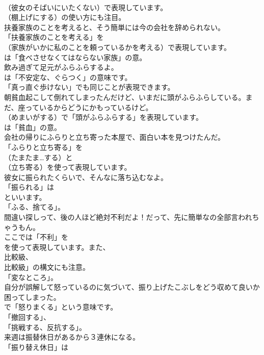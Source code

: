 \documentclass[8pt]{extreport}
\begin{document}
\begin{CJK}{UTF8}{min}
\\	（彼女のそばいにいたくない）で表現しています。
\\	（棚上げにする）の使い方にも注目。	
\\	扶養家族のことを考えると、そう簡単には今の会社を辞められない。 
\\	「扶養家族のことを考える」を
\\	（家族がいかに私のことを頼っているかを考える）で表現しています。
\\	は「食べさせなくてはならない家族」の意。	
\\	飲み過ぎて足元がふらふらするよ。 
\\	は「不安定な、ぐらつく」の意味です。
\\	「真っ直ぐ歩けない」でも同じことが表現できます。	
\\	朝貧血起こして倒れてしまったんだけど、いまだに頭がふらふらしている。まだ、座っているからどうにかもっているけど。 
\\	（めまいがする）で「頭がふらふらする」を表現しています。
\\	は「貧血」の意。	
\\	会社の帰りにふらりと立ち寄った本屋で、面白い本を見つけたんだ。 
\\	「ふらりと立ち寄る」を
\\	（たまたま…する）と
\\	（立ち寄る）を使って表現しています。	
\\	彼女に振られたくらいで、そんなに落ち込むなよ。 
\\	「振られる」は
\\	といいます。
\\	「ふる、捨てる」。	
\\	間違い探しって、後の人ほど絶対不利だよ！だって、先に簡単なの全部言われちゃうもん。 
\\	ここでは「不利」を
\\	を使って表現しています。また、
\\	比較級、
\\	比較級」の構文にも注意。
\\	「変なところ」。	
\\	自分が誤解して怒っているのに気づいて、振り上げたこぶしをどう収めて良いか困ってしまった。 
\\	で「怒りまくる」という意味です。
\\	「撤回する」、
\\	「挑戦する、反抗する」。	
\\	来週は振替休日があるから３連休になる。 
\\	「振り替え休日」は 

\end{CJK}
\end{document}
